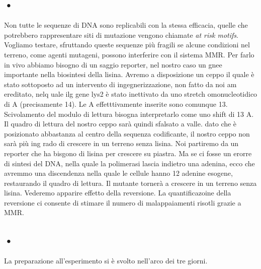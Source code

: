  \subsection{•}
 Non tutte le sequenze di DNA sono replicabili con la stessa efficacia, quelle che potrebbero rappresentare siti di mutazione vengono chiamate \textit{at risk motifs}.  Vogliamo testare, sfruttando queste sequenze più fragili se alcune condizioni nel terreno, come agenti mutageni, possono interferire con il sistema MMR. Per farlo in vivo abbiamo bisogno di un saggio reporter, nel nostro caso un gnee importante nella biosintesi della lisina. Avremo a disposizione un ceppo il quale è stato sottoposto ad un intervento di ingegnerizzazione, non fatto da noi am ereditato, nelq uale ilg gene lys2 è stato inettivato da uno stretch omonucleotidico di A (precisamente 14). Le A effetttivamente inserite sono comunque 13. Scivolamento del modulo di lettura bisogna interpretarlo come uno shift di 13 A. Il quadro di lettura del nostro ceppo sarà quindi sfalsato a valle. dato che è posizionato abbastanza al centro della sequenza codificante, il nostro ceppo non sarà più ing rado di crescere in un terreno senza lisina. Noi partiremo da un reporter che ha bisgono di lisina per crescere su piastra. Ma se ci fosse un erorre di sintesi del DNA, nella quale la polimerasi lascia indietro una adenina, ecco che avremmo una discendenza nella quale le cellule hanno 12 adenine esogene, restaurando il quadro di lettura. Il mutante tornerà a crescere in un terreno senza lisina. Vederemo apparire effetto della reversione. La quantificazoine della reversione ci consente di stimare il numero di malappaiamenti risotli grazie a MMR.
 
 \subsection{•}
 La preparazione all'esperimento si è svolto nell'arco dei tre giorni. 
 
 
 